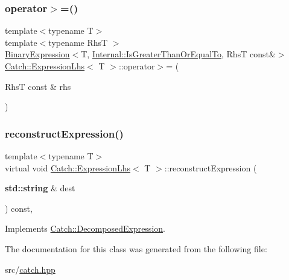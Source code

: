 \subsubsection{\texorpdfstring{operator$>$=()}{operator>=()}}
{\footnotesize\ttfamily template$<$typename T$>$ \\
template$<$typename RhsT $>$ \\
\hyperlink{class_catch_1_1_binary_expression}{Binary\+Expression}$<$T, \hyperlink{namespace_catch_1_1_internal_ae3f96598a7858155750bf38e7295d83ead2de7e9565e59e36c0987e402203ce1c}{Internal\+::\+Is\+Greater\+Than\+Or\+Equal\+To}, RhsT const\&$>$ \hyperlink{class_catch_1_1_expression_lhs}{Catch\+::\+Expression\+Lhs}$<$ T $>$\+::operator$>$= (\begin{DoxyParamCaption}\item[{RhsT const \&}]{rhs }\end{DoxyParamCaption})\hspace{0.3cm}{\ttfamily [inline]}}

\mbox{\label{class_catch_1_1_expression_lhs_a7684a053e8e88a4be475a536252630da}} 
\subsubsection{\texorpdfstring{reconstruct\+Expression()}{reconstructExpression()}}
{\footnotesize\ttfamily template$<$typename T$>$ \\
virtual void \hyperlink{class_catch_1_1_expression_lhs}{Catch\+::\+Expression\+Lhs}$<$ T $>$\+::reconstruct\+Expression (\begin{DoxyParamCaption}\item[{\textbf{ std\+::string} \&}]{dest }\end{DoxyParamCaption}) const\hspace{0.3cm}{\ttfamily [inline]}, {\ttfamily [virtual]}}



Implements \hyperlink{struct_catch_1_1_decomposed_expression_a9ce7f356dc96f11f80e40c82f5aa7e55}{Catch\+::\+Decomposed\+Expression}.



The documentation for this class was generated from the following file\+:\begin{DoxyCompactItemize}
\item 
src/\hyperlink{catch_8hpp}{catch.\+hpp}\end{DoxyCompactItemize}
